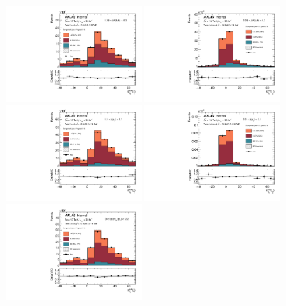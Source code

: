 \begin{figure}[htbp]
  \centering
 \includegraphics[width=0.45\textwidth]{figures/gbb/paperplots/Canv_Fit_dR_LpT_INF_SpT_INF_coarse_x}
 \includegraphics[width=0.45\textwidth]{figures/gbb/paperplots/Canv_Fit_b0_25_DeltaR_0_3_LpT_INF_SpT_INF_coarse_y}
 \includegraphics[width=0.45\textwidth]{figures/gbb/paperplots/Canv_Fit_zpt_LpT_INF_SpT_INF_coarse_x}  
 \includegraphics[width=0.45\textwidth]{figures/gbb/paperplots/Canv_Fit_b0_25_zpt_0_3_LpT_INF_SpT_INF_coarse_y}
 \includegraphics[width=0.45\textwidth]{figures/gbb/paperplots/Canv_Fit_M_LpT_INF_SpT_INF_coarse_x}

\end{figure}
